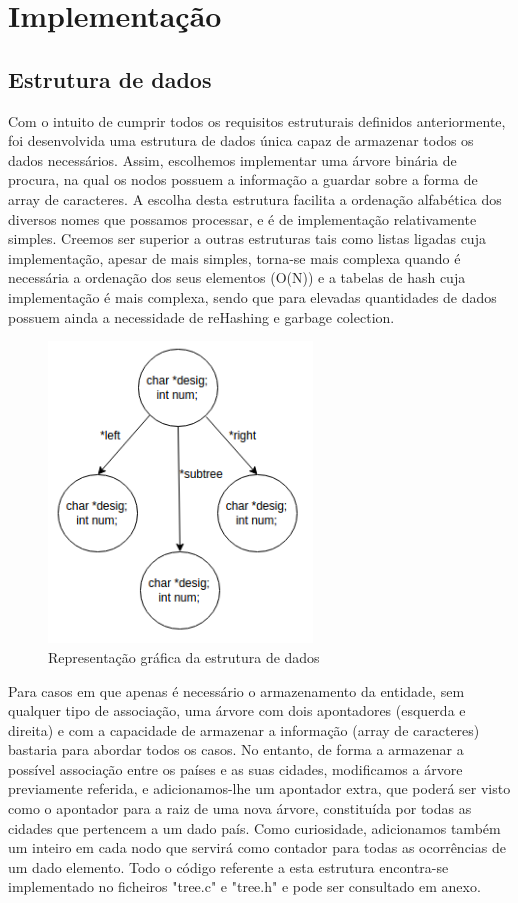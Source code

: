 \section{Implementação}
\label{seq:enamex-imp}
\subsection{Estrutura de dados}
\label{seq:enamex-est}
Com o intuito de cumprir todos os requisitos estruturais definidos anteriormente, foi desenvolvida uma estrutura de dados única capaz de armazenar todos os dados necessários. Assim, escolhemos implementar uma árvore binária de procura, na qual os nodos possuem a informação a guardar sobre a forma de array de caracteres. A escolha desta estrutura facilita a ordenação alfabética dos diversos nomes que possamos processar, e é de implementação relativamente simples. Creemos ser superior a outras estruturas tais como listas ligadas cuja implementação, apesar de mais simples, torna-se mais complexa quando é necessária a ordenação dos seus elementos (O(N)) e a tabelas de hash cuja implementação é mais complexa, sendo que para elevadas quantidades de dados possuem ainda a necessidade de reHashing e garbage colection. 

\begin{figure}[H]
\centering
\includegraphics[width=7cm]{anexos/2-2/tree.png}
\caption{Representação gráfica da estrutura de dados}
\end{figure}

Para casos em que apenas é necessário o armazenamento da entidade, sem qualquer tipo de associação, uma árvore com dois apontadores (esquerda e direita) e com a capacidade de armazenar a informação (array de caracteres) bastaria para abordar todos os casos. No entanto, de forma a armazenar a possível associação entre os países e as suas cidades, modificamos a árvore previamente referida, e adicionamos-lhe um apontador extra, que poderá ser visto como o apontador para a raiz de uma nova árvore, constituída por todas as cidades que pertencem a um dado país. Como curiosidade, adicionamos também um inteiro em cada nodo que servirá como contador para todas as ocorrências de um dado elemento. Todo o código referente a esta estrutura encontra-se implementado no ficheiros "tree.c" e "tree.h" e pode ser consultado em anexo.

